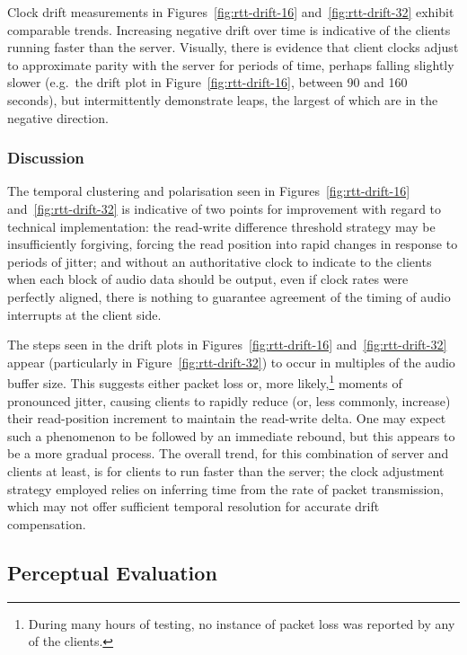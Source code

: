 \documentclass[utf8]{FrontiersinHarvard}
\newcommand{\figref}[1]{Figure~\ref{#1}}
\newcommand{\figsref}[2]{Figures~\ref{#1} and~\ref{#2}}
\begin{document}
    Clock drift measurements in \figsref{fig:rtt-drift-16}{fig:rtt-drift-32} exhibit
    comparable trends.
    Increasing negative drift over time is indicative of the clients running faster
    than the server.
    Visually, there is evidence that client clocks adjust to approximate parity
    with the server for periods of time, perhaps falling slightly slower (e.g.\
    the drift plot in \figref{fig:rtt-drift-16}, between 90 and 160 seconds), but
    intermittently demonstrate leaps, the largest of which are in the negative
    direction.

    \subsubsection{Discussion}\label{subsubsec:discussion-tech}

    The temporal clustering and polarisation seen in
    \figsref{fig:rtt-drift-16}{fig:rtt-drift-32} is indicative of two points for
    improvement with regard to technical implementation:
    the read-write difference threshold strategy may be insufficiently forgiving,
    forcing the read position into rapid changes in response to periods of jitter;
    and without an authoritative clock to indicate to the clients when each block of
    audio data should be output, even if clock rates were perfectly aligned, there
    is nothing to guarantee agreement of the timing of audio interrupts at the
    client side.

    The steps seen in the drift plots in
    \figsref{fig:rtt-drift-16}{fig:rtt-drift-32} appear (particularly in
    \figref{fig:rtt-drift-32}) to occur in multiples of the audio buffer size.
    This suggests either packet loss or, more likely,\footnote{
        During many hours of testing, no instance of packet loss was reported by any
        of the clients.
    } moments of pronounced jitter, causing
    clients to rapidly reduce (or, less commonly, increase) their read-position
    increment to maintain the read-write delta.
    One may expect such a phenomenon to be followed by an immediate rebound, but
    this appears to be a more gradual process.
    The overall trend, for this combination of server and clients at least, is for
    clients to run faster than the server;
    the clock adjustment strategy employed relies on inferring time from the rate of
    packet transmission, which may not offer sufficient temporal resolution for
    accurate drift compensation.

    \subsection{Perceptual Evaluation}\label{subsec:perceptual-evaluation}
\end{document}
